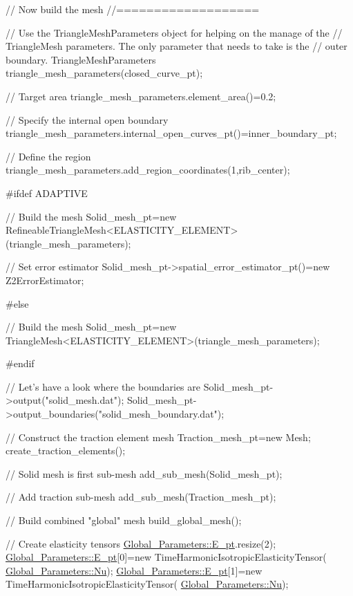 \begin{DoxyCodeInclude}
 \textcolor{comment}{// Now build the mesh}
 \textcolor{comment}{//===================}


 \textcolor{comment}{// Use the TriangleMeshParameters object for helping on the manage of the}
 \textcolor{comment}{// TriangleMesh parameters. The only parameter that needs to take is the}
 \textcolor{comment}{// outer boundary.}
 TriangleMeshParameters triangle\_mesh\_parameters(closed\_curve\_pt);

 \textcolor{comment}{// Target area}
 triangle\_mesh\_parameters.element\_area()=0.2;

 \textcolor{comment}{// Specify the internal open boundary}
 triangle\_mesh\_parameters.internal\_open\_curves\_pt()=inner\_boundary\_pt;

 \textcolor{comment}{// Define the region}
 triangle\_mesh\_parameters.add\_region\_coordinates(1,rib\_center);
 
\textcolor{preprocessor}{#ifdef ADAPTIVE}

 \textcolor{comment}{// Build the mesh}
 Solid\_mesh\_pt=\textcolor{keyword}{new} 
  RefineableTriangleMesh<ELASTICITY\_ELEMENT>(triangle\_mesh\_parameters);

 \textcolor{comment}{// Set error estimator}
 Solid\_mesh\_pt->spatial\_error\_estimator\_pt()=\textcolor{keyword}{new} Z2ErrorEstimator;

\textcolor{preprocessor}{#else}

 \textcolor{comment}{// Build the mesh}
 Solid\_mesh\_pt=\textcolor{keyword}{new} 
  TriangleMesh<ELASTICITY\_ELEMENT>(triangle\_mesh\_parameters);

\textcolor{preprocessor}{#endif}


 \textcolor{comment}{// Let's have a look where the boundaries are}
 Solid\_mesh\_pt->output(\textcolor{stringliteral}{"solid\_mesh.dat"});
 Solid\_mesh\_pt->output\_boundaries(\textcolor{stringliteral}{"solid\_mesh\_boundary.dat"});
 
 \textcolor{comment}{// Construct the traction element mesh}
 Traction\_mesh\_pt=\textcolor{keyword}{new} Mesh;
 create\_traction\_elements(); 
 
 \textcolor{comment}{// Solid mesh is first sub-mesh}
 add\_sub\_mesh(Solid\_mesh\_pt);

 \textcolor{comment}{// Add traction sub-mesh}
 add\_sub\_mesh(Traction\_mesh\_pt);

 \textcolor{comment}{// Build combined "global" mesh}
 build\_global\_mesh();
 
 \textcolor{comment}{// Create elasticity tensors}
 \hyperlink{namespaceGlobal__Parameters_a73c731fa617a9d92851e4195493262e7}{Global\_Parameters::E\_pt}.resize(2);
 \hyperlink{namespaceGlobal__Parameters_a73c731fa617a9d92851e4195493262e7}{Global\_Parameters::E\_pt}[0]=\textcolor{keyword}{new} TimeHarmonicIsotropicElasticityTensor(
    \hyperlink{namespaceGlobal__Parameters_a20fccdcfa2c15ad8b951b9ada3bb1661}{Global\_Parameters::Nu});
 \hyperlink{namespaceGlobal__Parameters_a73c731fa617a9d92851e4195493262e7}{Global\_Parameters::E\_pt}[1]=\textcolor{keyword}{new} TimeHarmonicIsotropicElasticityTensor(
  \hyperlink{namespaceGlobal__Parameters_a20fccdcfa2c15ad8b951b9ada3bb1661}{Global\_Parameters::Nu});


\end{DoxyCodeInclude}
